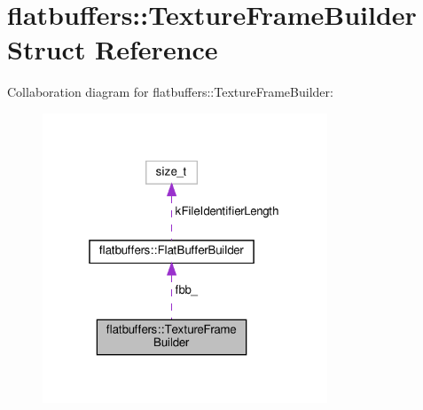 \hypertarget{structflatbuffers_1_1TextureFrameBuilder}{}\section{flatbuffers\+:\+:Texture\+Frame\+Builder Struct Reference}
\label{structflatbuffers_1_1TextureFrameBuilder}


Collaboration diagram for flatbuffers\+:\+:Texture\+Frame\+Builder\+:
\nopagebreak
\begin{figure}[H]
\begin{center}
\leavevmode
\includegraphics[width=241pt]{structflatbuffers_1_1TextureFrameBuilder__coll__graph}
\end{center}
\end{figure}
